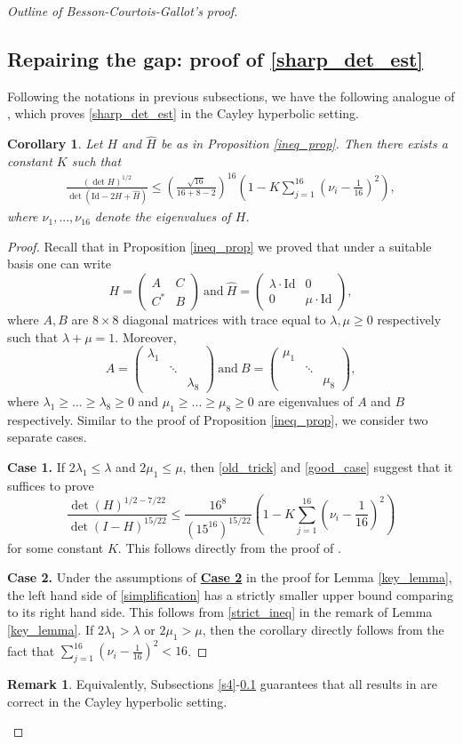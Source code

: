 \documentclass{article}
\newcommand{\id}{\mathrm{Id}}
\newcommand{\matii}[2]{\left(\begin{array}{cc} #1\\#2\end{array}\right)}
\newcommand{\matiii}[3]{\left(\begin{array}{ccc} #1\\#2\\#3\end{array}\right)}
\newtheorem{cor}[thm]{Corollary}
\theoremstyle{definition}
\newtheorem*{rmk}{Remark}
\begin{document}
\begin{proof}[Outline of Besson-Courtois-Gallot's proof]
\subsection{Repairing the gap: proof of \eqref{sharp_det_est}}\label{s6}
Following the notations in previous subsections, we have the following analogue of \cite[B.5 Proposition]{BCG1}, which proves \eqref{sharp_det_est} in the Cayley hyperbolic setting.
\begin{cor}\label{key_cor}
Let $H$ and $\widehat{H}$ be as in Proposition \ref{ineq_prop}. Then there exists a constant $K$ such that
\begin{align}\label{det_error}
\frac{\left(\det{H}\right)^{1/2}}{\det\left(\id-2H+\widehat{H}\right)}\leq \left(\frac{\sqrt{16}}{16+8-2}\right)^{16}\left(1-K\sum_{j=1}^{16}\left(\nu_i-\frac{1}{16}\right)^2\right),
\end{align}
where $\nu_1,...,\nu_{16}$ denote the eigenvalues of $H$.
\end{cor}
\begin{proof}
Recall that in Proposition \ref{ineq_prop} we proved that under a suitable basis one can write
$$H=\matii{A&C}{C^*&B}\mathrm{~and~}\widehat{H}=\matii{\lambda\cdot\id&0}{0&\mu\cdot\id},$$
where $A, B$ are $8\times 8$ diagonal matrices with trace equal to $\lambda,\mu\geq 0$ respectively such that $\lambda+\mu=1$. Moreover,
$$A=\matiii{\lambda_1&&}{&\ddots&}{&&\lambda_8}\mathrm{~and~}B=\matiii{\mu_1&&}{&\ddots&}{&&\mu_8},$$
where $\lambda_1\geq...\geq\lambda_8\geq0$ and $\mu_1\geq...\geq\mu_8\geq0$ are eigenvalues of $A$ and $B$ respectively. Similar to the proof of Proposition \ref{ineq_prop}, we consider two separate cases.

\textbf{Case 1.} If $2\lambda_1\leq\lambda$ and $2\mu_1\leq\mu$, then \eqref{old_trick} and \eqref{good_case} suggest that it suffices to prove
$$\frac{\det\left(H\right)^{1/2-7/22}}{\det(I-H)^{15/22}}\leq \frac{16^8}{(15^{16})^{15/22}}\left(1-K\sum_{j=1}^{16}\left(\nu_i-\frac{1}{16}\right)^2\right)$$
for some constant $K$. This follows directly from the proof of \cite[Proposition B.5]{BCG1}.


\textbf{Case 2.} Under the assumptions of \hyperlink{case2}{\textbf{Case 2}} in the proof for Lemma \ref{key_lemma}, the left hand side of \eqref{simplification} has a strictly smaller upper bound comparing to its right hand side. This follows from \eqref{strict_ineq} in the remark of Lemma \ref{key_lemma}. If $2\lambda_1>\lambda$ or $2\mu_1>\mu$, then the corollary directly follows from the fact that $\sum_{j=1}^{16}\left(\nu_i-\frac{1}{16}\right)^2<16$.
\end{proof}
\begin{rmk}
Equivalently, Subsections \ref{s4}-\ref{s6} guarantees that all results in \cite[Appendice B]{BCG1} are correct in the Cayley hyperbolic setting.
\end{rmk}




\end{proof}
\end{document}
